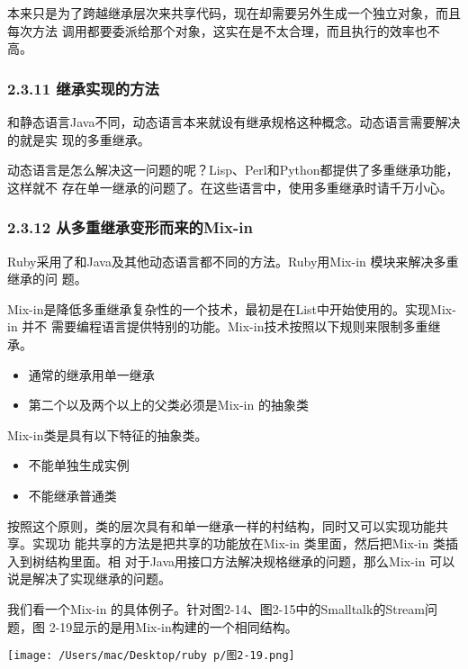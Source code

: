 \documentclass[11pt]{ctexart}
\begin{document}
本来只是为了跨越继承层次来共享代码，现在却需要另外生成一个独立对象，而且每次方法
调用都要委派给那个对象，这实在是不太合理，而且执行的效率也不高。
\subsubsection{2.3.11 继承实现的方法}
\label{sec:orgc81995c}

和静态语言Java不同，动态语言本来就设有继承规格这种概念。动态语言需要解决的就是实
现的多重继承。

动态语言是怎么解决这一问题的呢？Lisp、Perl和Python都提供了多重继承功能，这样就不
存在单一继承的问题了。在这些语言中，使用多重继承时请千万小心。
\subsubsection{2.3.12 从多重继承变形而来的Mix-in}
\label{sec:orgf5d4905}

Ruby采用了和Java及其他动态语言都不同的方法。Ruby用Mix-in 模块来解决多重继承的问
题。

Mix-in是降低多重继承复杂性的一个技术，最初是在List中开始使用的。实现Mix-in 并不
需要编程语言提供特别的功能。Mix-in技术按照以下规则来限制多重继承。

\begin{itemize}
\item 通常的继承用单一继承
\item 第二个以及两个以上的父类必须是Mix-in 的抽象类
\end{itemize}

Mix-in类是具有以下特征的抽象类。

\begin{itemize}
\item 不能单独生成实例
\item 不能继承普通类
\end{itemize}

按照这个原则，类的层次具有和单一继承一样的村结构，同时又可以实现功能共享。实现功
能共享的方法是把共享的功能放在Mix-in 类里面，然后把Mix-in 类插入到树结构里面。相
对于Java用接口方法解决规格继承的问题，那么Mix-in 可以说是解决了实现继承的问题。

我们看一个Mix-in 的具体例子。针对图2-14、图2-15中的Smalltalk的Stream问题，图
2-19显示的是用Mix-in构建的一个相同结构。

\begin{center}
\texttt{[image: /Users/mac/Desktop/ruby p/图2-19.png]}
\end{center}
\end{document}
